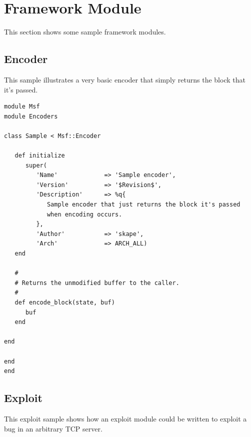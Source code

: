 \documentclass{report}
\begin{document}
    \section{Framework Module}

\par
This section shows some sample framework modules.

        \subsection{Encoder}

\par
This sample illustrates a very basic encoder that simply returns the
block that it's passed.

\footnotesize{
\begin{verbatim}
module Msf
module Encoders

class Sample < Msf::Encoder

   def initialize
      super(
         'Name'             => 'Sample encoder',
         'Version'          => '$Revision$',
         'Description'      => %q{
            Sample encoder that just returns the block it's passed
            when encoding occurs.
         },
         'Author'           => 'skape',
         'Arch'             => ARCH_ALL)
   end

   #
   # Returns the unmodified buffer to the caller.
   #
   def encode_block(state, buf)
      buf
   end

end

end
end
\end{verbatim}}

        \subsection{Exploit}

\par
This exploit sample shows how an exploit module could be written to
exploit a bug in an arbitrary TCP server.
\end{document}
